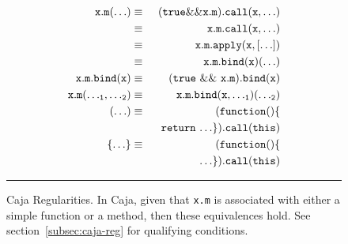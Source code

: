 \documentclass[letterpaper,twocolumn,10pt]{article}
\newcommand{\code}[1]{{\tt {#1}}}              %
\begin{document}
\begin{figure}
\begin{eqnarray}
  \code{x.m(\ldots)}         & \equiv & \code{(true \&\& x.m).call(x,\ldots)}         \label{eq:caja-true-call} \\
                             & \equiv & \code{x.m.call(x,\ldots)}                     \label{eq:caja-call} \\
                             & \equiv & \code{x.m.apply(x,[\ldots])}                  \label{eq:caja-apply} \\
                             & \equiv & \code{x.m.bind(x)(\ldots)}                    \label{eq:caja-bind-1} \\
  \code{x.m.bind(x)}         & \equiv & \code{(true\ \&\&\ x.m).bind(x)}              \label{eq:caja-true-bind} \\ 
  \code{x.m({\ldots}_1,{\ldots}_2)} 
                             & \equiv & \code{x.m.bind(x,{\ldots}_1)({\ldots}_2)}     \label{eq:caja-bind-n} \\
  \code{(\ldots)}            & \equiv & \code{(function()\{}                          \label{eq:caja-thunk-expr} \\
                             &        & \code{\ \ return\ {\ldots\}}).call(this)}     \nonumber\\
  \code{\{{\ldots}\}}        & \equiv & \code{(function()\{}                          \label{eq:caja-thunk-stmt} \\
                             &        & \code{\ \ \ldots\}).call(this)}               \nonumber
\end{eqnarray}

\caption[Caja Regularities.]{Caja Regularities. In Caja, given that \code{x.m} is associated with either a 
simple function or a method, then these equivalences hold. See section~\ref{subsec:caja-reg} for qualifying conditions. \\ } \hrule
\label{eqn:caja-regularities}
\end{figure}
\end{document}

